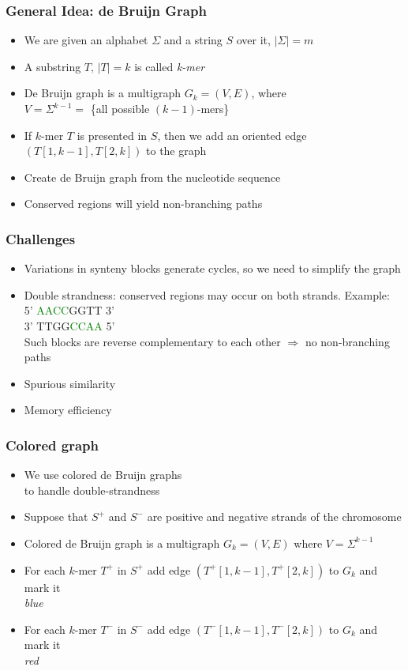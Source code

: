 \documentclass[svgnames,14pt]{beamer}
\begin{document}
\begin{frame}
\frametitle{General Idea: de Bruijn Graph}
\begin{itemize}
\item We are given an alphabet \( \Sigma \) and a string \( S \) over it, \(|\Sigma| = m \)
\item A substring \( T, \, |T| = k \) is called \textit{k-mer}
\item De Bruijn graph is a multigraph \( G_{k} = (V, E) \), where \\
\( V = \Sigma^{k - 1} = \) \{all possible \( (k - 1) \)-mers\} \\
\item If \(k\)-mer \( T \) is presented in \( S \), then we add an oriented edge \( (T[1, k - 1], T[2, k]) \) to the graph
\item Create de Bruijn graph from the nucleotide sequence
\item Conserved regions will yield non-branching paths
\end{itemize}
\end{frame}

\begin{frame}
\frametitle{Challenges}
\begin{itemize}
\item Variations in synteny blocks generate cycles, so we need to simplify the graph
\item Double strandness: conserved regions may occur on both strands. Example: \\
5' \textcolor{Green}{AACC}GGTT 3' \\
3' TTGG\textcolor{Green}{CCAA} 5' \\
Such blocks are reverse complementary to each other \( \Rightarrow \) no non-branching paths
\item Spurious similarity
\item Memory efficiency
\end{itemize}
\end{frame}

\begin{frame}
\frametitle{Colored graph}
\begin{itemize}
\item We use colored de Bruijn graphs \\
 to handle double-strandness
\item Suppose that \( S^{+} \) and \( S^{-} \) are positive and negative strands of the chromosome
\item Colored de Bruijn graph  is a multigraph \( G_{k} = (V, E) \) where \( V =  \Sigma^{k - 1} \)
\item For each \(k\)-mer \(T^{+}\) in \(S^{+}\) add edge \( (T^{+}[1, k - 1], T^{+}[2, k]) \) to \( G_{k} \) and mark it \\ \textit{blue}
\item For each \(k\)-mer \(T^{-}\) in \(S^{-}\) add edge \( (T^{-}[1, k - 1], T^{-}[2, k]) \) to \( G_{k} \) and mark it \\ \textit{red}
\end{itemize}
\end{frame}
\end{document}
